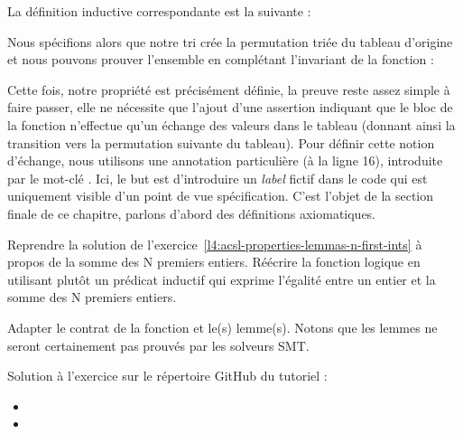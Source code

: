 La définition inductive correspondante est la suivante :






Nous spécifions alors que notre tri crée la permutation triée du tableau
d'origine et nous pouvons prouver l'ensemble en complétant l'invariant de la
fonction :





Cette fois, notre propriété est précisément définie, la preuve reste assez
simple à faire passer, elle ne nécessite que l'ajout d'une assertion indiquant que le bloc
de la fonction n'effectue qu'un échange des valeurs dans le tableau (donnant
ainsi la transition vers la permutation suivante du tableau). Pour définir cette
notion d'échange, nous utilisons une annotation particulière (à la ligne 16),
introduite par le mot-clé . Ici, le but est d'introduire un \textit{label}
fictif dans le code qui est uniquement visible d'un point de vue spécification.
C'est l'objet de la section finale de ce chapitre, parlons d'abord des définitions
axiomatiques.








Reprendre la solution de l'exercice~\ref{l4:acsl-properties-lemmas-n-first-ints} à
propos de la somme des N premiers entiers. Réécrire la fonction logique en utilisant
plutôt un prédicat inductif qui exprime l'égalité entre un entier et la somme des
N premiers entiers.





Adapter le contrat de la fonction et le(s) lemme(s). Notons que les lemmes ne
seront certainement pas prouvés par les solveurs SMT.

\begin{Information}
  Solution à l'exercice sur le répertoire GitHub du tutoriel :
  \begin{itemize}
    \item {}
    \item {}
  \end{itemize}
\end{Information}


